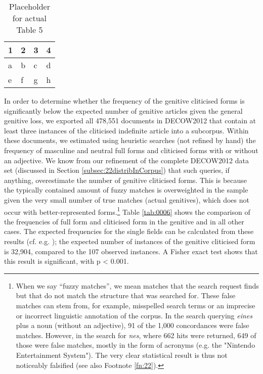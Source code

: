 \begin{table}
	\centering
	\begin{tabular}{llll}
		\toprule
		\textbf{1} & \textbf{2} & \textbf{3} & \textbf{4} \\
		\midrule
		a & b & c & d \\
		e & f & g & h \\
		\bottomrule
	\end{tabular}
	\caption{Placeholder for actual Table 5}
	\label{tab:0005}
\end{table}

In order to determine whether the frequency of the genitive cliticised forms is significantly below the expected number of genitive articles given the general genitive loss, we exported all 478,551 documents in DECOW2012 that contain at least three instances of the cliticised indefinite article into a subcorpus.
Within these documents, we estimated using heuristic searches (not refined by hand) the frequency of masculine and neutral full forms and cliticised forms with or without an adjective.
We know from our refinement of the complete DECOW2012 data set (discussed in Section \ref{subsec:22distribInCorpus}) that such queries, if anything, overestimate the number of genitive cliticised forms.
This is because the typically contained amount of fuzzy matches is overweighted in the sample given the very small number of true matches (actual genitives), which does not occur with better-represented forms.\footnote{
	When we say ``fuzzy matches'', we mean matches that the search request finds but that do not match the structure that was searched for.
	These false matches can stem from, for example, misspelled search terms or an imprecise or incorrect linguistic annotation of the corpus.
	In the search querying \textit{eines} plus a noun (without an adjective), 91 of the 1,000 concordances were false matches.
	However, in the search for \textit{nes}, where 662 hits were returned, 649 of those were false matches, mostly in the form of acronyms (e.g. the "Nintendo Entertainment System").
	The very clear statistical result is thus not noticeably falsified (see also Footnote \ref{fn:22}).}%
Table \ref{tab:0006} shows the comparison of the frequencies of full form and cliticised form in the genitive and in all other cases.
The expected frequencies for the single fields can be calculated from these results (cf. e.g. \citealt[170]{Gries2008}); the expected number of instances of the genitive cliticised form is 32,904, compared to the 107 observed instances.
A Fisher exact test shows that this result is significant, with p < 0.001.
